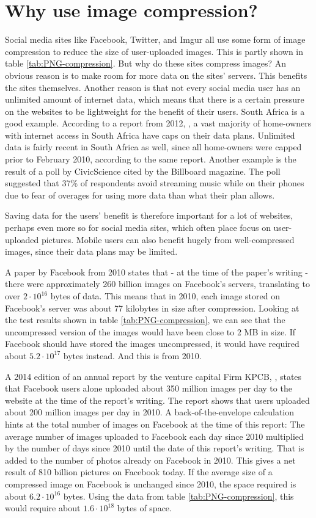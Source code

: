 \section{Why use image compression?}
Social media sites like Facebook, Twitter, and Imgur all use some form of image compression to reduce the size of user-uploaded images.
This is partly shown in table \ref{tab:PNG-compression}.
But why do these sites compress images?
An obvious reason is to make room for more data on the sites' servers.
This benefits the sites themselves.
Another reason is that not every social media user has an unlimited amount of internet data, which means that there is a certain pressure on the websites to be lightweight for the benefit of their users.
South Africa is a good example. According to a report from 2012, \citep{chetty_2012}, a vast majority of home-owners with internet access in South Africa have caps on their data plans.
Unlimited data is fairly recent in South Africa as well, since all home-owners were capped prior to February 2010, according to the same report.
Another example is the result of a poll by CivicScience\citep{tmobilemusic} cited by the Billboard magazine.
The poll suggested that 37\% of respondents avoid streaming music while on their phones due to fear of overages for using more data than what their plan allows.

Saving data for the users' benefit is therefore important for a lot of websites, perhaps even more so for social media sites, which often place focus on user-uploaded pictures. Mobile users can also benefit hugely from well-compressed images, since their data plans may be limited.

A paper by Facebook from 2010 \citep{beaver2010} states that - at the time of the paper's writing - there were approximately 260 billion images on Facebook's servers, translating to over $2\cdot10^{16}$ bytes of data.
This means that in 2010, each image stored on Facebook's server was about 77 kilobytes in size after compression.
Looking at the test results shown in table \ref{tab:PNG-compression}, we can see that the uncompressed version of the images would have been close to 2 MB in size.
If Facebook should have stored the images uncompressed, it would have required about $5.2\cdot10^{17}$ bytes instead.
And this is from 2010.

A 2014 edition of an annual report by the venture capital Firm KPCB, \citep{meeker2014internet}, states that Facebook users alone uploaded about
350 million images per day to the website at the time of the report's writing.
The report shows that users uploaded about 200 million images per day in 2010.
A back-of-the-envelope calculation hints at the total number of images on Facebook at the time of this report:
The average number of images uploaded to Facebook each day since 2010 multiplied by the number of days since 2010 until the date of this report's writing.
That is added to the number of photos already on Facebook in 2010.
This gives a net result of 810 billion pictures on Facebook today.
If the average size of a compressed image on Facebook is unchanged since 2010, the space required is about $6.2\cdot10^{16}$ bytes.
Using the data from table \ref{tab:PNG-compression}, this would require about $1.6\cdot10^{18}$ bytes of space.

